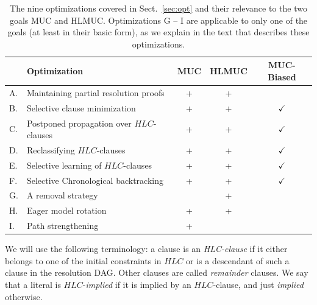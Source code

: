 \documentclass[twoside,11pt]{article}
\begin{document}
\begin{table}
\setlength{\abovecaptionskip}{15pt }
\begin{center}
\begin{tabular}{llccc} \hline
   & Optimization  &   MUC & HLMUC  & MUC-Biased\\ \hline
A. & Maintaining partial resolution proofs & + & + &  \\
B. & Selective clause minimization &  + & +   & $\checkmark$\\
C. & Postponed propagation over $HLC$-clauses & + & +  & $\checkmark$ \\
D. & Reclassifying $HLC$-clauses & + & +  & $\checkmark$ \\
E. & Selective learning of $HLC$-clauses & + & +  & $\checkmark$\\
F. & Selective Chronological backtracking & + & +  & $\checkmark$\\
G. & A removal strategy & & + & \\
H. & Eager model rotation & + & + & \\
I. & Path strengthening & + & & \\ \hline
\end{tabular}

\caption{The nine optimizations covered in Sect.~\ref{sec:opt} and their
relevance to the two goals MUC and HLMUC. Optimizations G -- I are applicable to only one of the
goals (at least in their basic form), as we explain in the text that
describes these optimizations.}\label{fig:table}
\end{center}
\end{table}




We will use the following terminology: a clause is an \emph{HLC-clause} if it
either belongs to one of the initial constraints in $HLC$ or is a descendant
of such a clause in the resolution DAG. Other clauses are called
\emph{remainder} clauses. We say that a literal is $HLC$-\emph{implied} if it
is implied by an $HLC$-clause, and just \emph{implied} otherwise.
\end{document}
